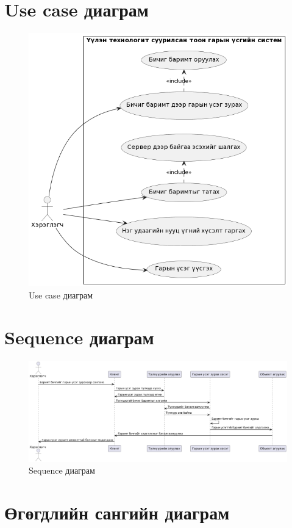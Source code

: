 \section{Use case диаграм}
\begin{figure}[h]
	\centering
	\includegraphics[scale=0.66]{assets/usecase_mn.png}
	\caption{Use case диаграм}
	\label{fig:usecasemn}
\end{figure}
\pagebreak
\section{Sequence диаграм}
\begin{figure}[h!]
	\centering
	\includegraphics[scale=0.45, angle=90]{assets/sequence2.png}
	\caption{Sequence диаграм}
	\label{fig:usecasemn}
\end{figure}
\newpage
\section{Өгөгдлийн сангийн диаграм}

